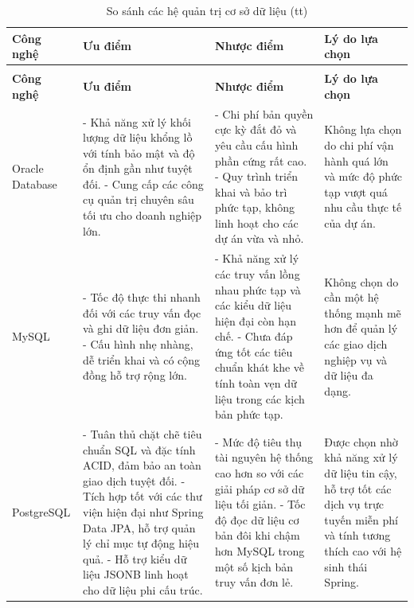 \begin{center}
\renewcommand{\arraystretch}{1.5}
\begin{longtable}{|p{2.5cm}|p{4cm}|p{4cm}|p{3.5cm}|}
\caption{So sánh các hệ quản trị cơ sở dữ liệu} \label{tab:database_comparison} \\
\hline
\centering\textbf{Công nghệ} & \centering\textbf{Ưu điểm} & \centering\textbf{Nhược điểm} & \centering\arraybackslash\textbf{Lý do lựa chọn} \\ \hline
\endfirsthead

\caption[]{So sánh các hệ quản trị cơ sở dữ liệu (tt)} \\ \hline
\centering\textbf{Công nghệ} & \centering\textbf{Ưu điểm} & \centering\textbf{Nhược điểm} & \centering\arraybackslash\textbf{Lý do lựa chọn} \\ \hline
\endhead

Oracle Database&
- Khả năng xử lý khối lượng dữ liệu khổng lồ với tính bảo mật và độ ổn định gần như tuyệt đối. \newline
- Cung cấp các công cụ quản trị chuyên sâu tối ưu cho doanh nghiệp lớn. &
- Chi phí bản quyền cực kỳ đắt đỏ và yêu cầu cấu hình phần cứng rất cao. \newline
- Quy trình triển khai và bảo trì phức tạp, không linh hoạt cho các dự án vừa và nhỏ. &
Không lựa chọn do chi phí vận hành quá lớn và mức độ phức tạp vượt quá nhu cầu thực tế của dự án. \\ \hline

MySQL &
- Tốc độ thực thi nhanh đối với các truy vấn đọc và ghi dữ liệu đơn giản. \newline
- Cấu hình nhẹ nhàng, dễ triển khai và có cộng đồng hỗ trợ rộng lớn. &
- Khả năng xử lý các truy vấn lồng nhau phức tạp và các kiểu dữ liệu hiện đại còn hạn chế. \newline
- Chưa đáp ứng tốt các tiêu chuẩn khát khe về tính toàn vẹn dữ liệu trong các kịch bản phức tạp. &
Không chọn do cần một hệ thống mạnh mẽ hơn để quản lý các giao dịch nghiệp vụ và dữ liệu đa dạng. \\\hline

PostgreSQL &
- Tuân thủ chặt chẽ tiêu chuẩn SQL và đặc tính ACID, đảm bảo an toàn giao dịch tuyệt đối. \newline 
- Tích hợp tốt với các thư viện hiện đại như Spring Data JPA, hỗ trợ quản lý chỉ mục tự động hiệu quả. \newline
- Hỗ trợ kiểu dữ liệu JSONB linh hoạt cho dữ liệu phi cấu trúc. & 
- Mức độ tiêu thụ tài nguyên hệ thống cao hơn so với các giải pháp cơ sở dữ liệu tối giản. \newline 
- Tốc độ đọc dữ liệu cơ bản đôi khi chậm hơn MySQL trong một số kịch bản truy vấn đơn lẻ. & 
Được chọn nhờ khả năng xử lý dữ liệu tin cậy, hỗ trợ tốt các dịch vụ trực tuyến miễn phí và tính tương thích cao với hệ sinh thái Spring. \\ \hline

\end{longtable}
\end{center}

